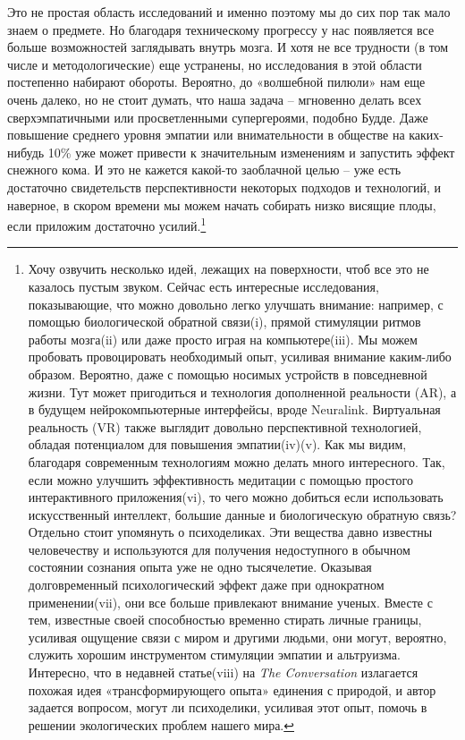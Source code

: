 \documentclass[12pt,a4paper]{report}
\begin{document}
\noindent Это не простая область исследований и именно поэтому мы до сих пор так мало знаем о предмете. Но благодаря техническому прогрессу у нас появляется все больше возможностей заглядывать внутрь мозга. И хотя не все трудности (в том числе и методологические) еще устранены, но исследования в этой области постепенно набирают обороты. Вероятно, до «волшебной пилюли» нам еще очень далеко, но не стоит думать, что наша задача -- мгновенно делать всех сверхэмпатичными или просветленными супергероями, подобно Будде. Даже повышение среднего уровня эмпатии или внимательности в обществе на каких-нибудь 10\% уже может привести к значительным изменениям и запустить эффект снежного кома. И это не кажется какой-то заоблачной целью -- уже есть достаточно свидетельств перспективности некоторых подходов и технологий, и наверное, в скором времени мы можем начать собирать низко висящие плоды, если приложим достаточно усилий.\footnote{Хочу озвучить несколько идей, лежащих на поверхности, чтоб все это не казалось пустым звуком. Сейчас есть интересные исследования, показывающие, что можно довольно легко улучшать внимание: например, с помощью биологической обратной связи(i), прямой стимуляции ритмов работы мозга(ii) или даже просто играя на компьютере(iii). Мы можем пробовать провоцировать необходимый опыт, усиливая внимание каким-либо образом. Вероятно, даже с помощью носимых устройств в повседневной жизни. Тут может пригодиться и технология дополненной реальности (AR), а в будущем нейрокомпьютерные интерфейсы, вроде Neuralink. Виртуальная реальность (VR) также выглядит довольно перспективной технологией, обладая потенциалом для повышения эмпатии(iv)(v). Как мы видим, благодаря современным технологиям можно делать много интересного. Так, если можно улучшить эффективность медитации с помощью простого интерактивного приложения(vi), то чего можно добиться если использовать искусственный интеллект, большие данные и биологическую обратную связь?\\
Отдельно стоит упомянуть о психоделиках. Эти вещества давно известны человечеству и используются для получения недоступного в обычном состоянии сознания опыта уже не одно тысячелетие. Оказывая долговременный психологический эффект даже при однократном применении(vii), они все больше привлекают внимание ученых. Вместе с тем, известные своей способностью временно стирать личные границы, усиливая ощущение связи с миром и другими людьми, они могут, вероятно, служить хорошим инструментом стимуляции эмпатии и альтруизма. Интересно, что в недавней статье(viii) на \emph{The Conversation} излагается похожая идея «трансформирующего опыта» единения с природой, и автор задается вопросом, могут ли психоделики, усиливая этот опыт, помочь в решении экологических проблем нашего мира.
}
\end{document}
